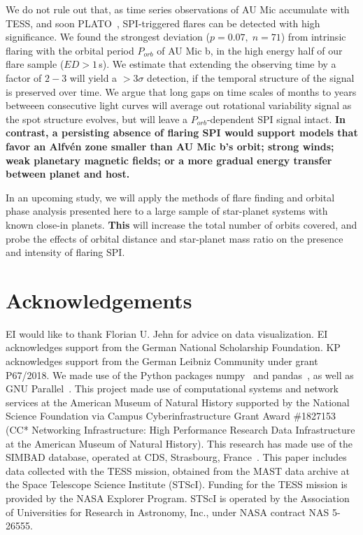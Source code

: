 \documentclass[fleqn,usenatbib]{mnras}%
\begin{document}
We do not rule out that, as time series observations of AU Mic accumulate with TESS, and soon PLATO~\citep{rauer2014plato}, SPI-triggered flares can be detected with high significance. We found the strongest deviation \mbox{($p=0.07,\;n=71$)} from intrinsic flaring with the orbital period $P_{orb}$ of AU Mic b, in the high energy half of our flare sample ($ED>1$\,s). We estimate that extending the observing time by a factor of $2-3$ will yield a $>3\sigma$ detection, if the temporal structure of the signal is preserved over time. We argue that long gaps on time scales of months to years betweeen consecutive light curves will average out rotational variability signal as the spot structure evolves, but will leave a $P_{orb}$-dependent SPI signal intact. \textbf{In contrast, a persisting absence of flaring SPI would support models that favor an Alfv\'en zone smaller than AU Mic b's orbit; strong winds; weak planetary magnetic fields; or a more gradual energy transfer between planet and host.} 

In an upcoming study, we will apply the methods of flare finding and orbital phase analysis presented here to a large sample of star-planet systems with known close-in planets. \textbf{This} will increase the total number of orbits covered, and probe the effects of orbital distance and star-planet mass ratio on the presence and intensity of flaring SPI.
\section*{Acknowledgements}
EI would like to thank Florian U. Jehn for advice on data visualization. EI acknowledges support from the German National Scholarship Foundation. KP acknowledges support from the German Leibniz Community under grant P67/2018. We made use of the Python packages numpy~\citep{numpy2020} and pandas~\citep{pandas2010,pandas2020software}, as well as GNU Parallel~\citep{tange2018gnu}. This project made use of computational systems and network services at the American Museum of Natural History supported by the National Science Foundation via Campus Cyberinfrastructure Grant Award \#1827153 (CC* Networking Infrastructure: High Performance Research Data Infrastructure at the American Museum of Natural History). This research has made use of the SIMBAD database, operated at CDS, Strasbourg, France~\citep{wenger2000}. This paper includes data collected with the TESS mission, obtained from the MAST data archive at the Space Telescope Science Institute (STScI). Funding for the TESS mission is provided by the NASA Explorer Program. STScI is operated by the Association of Universities for Research in Astronomy, Inc., under NASA contract NAS 5-26555.
\end{document}
